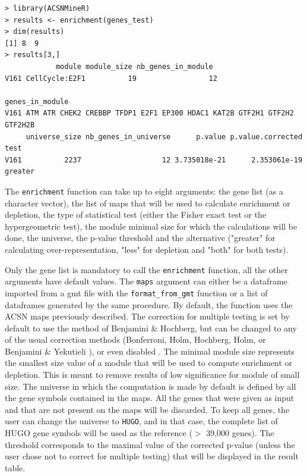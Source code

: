 \documentclass{article}
\begin{document}
\begin{verbatim}
> library(ACSNMineR)
> results <- enrichment(genes_test)
> dim(results)
[1] 8  9
> results[3,]
            module module_size nb_genes_in_module
V161 CellCycle:E2F1          19                 12
                                                             genes_in_module
V161 ATM ATR CHEK2 CREBBP TFDP1 E2F1 EP300 HDAC1 KAT2B GTF2H1 GTF2H2 GTF2H2B
     universe_size nb_genes_in_universe      p.value p.value.corrected    test
V161          2237                   12 3.735018e-21      2.353061e-19 greater
\end{verbatim}


The \verb|enrichment| function can take up to eight arguments: the gene list (as
a character vector), the list of maps that will be used to calculate enrichment
or depletion, the type of statistical test (either the Fisher exact test or the
hypergeometric test), the module minimal size for which the calculations will be
done, the universe, the p-value threshold and the alternative ("greater" for
calculating over-representation, "less" for depletion and "both" for both
tests).

Only the gene list is mandatory to call the \verb|enrichment| function, all the
other arguments have default values.  The \verb|maps| argument can either be a
dataframe imported from a gmt file with the \verb|format_from_gmt| function or
a list of dataframes generated by the same procedure. By default, the function
uses the ACSN maps previously described.  The correction for multiple testing
is set by default to use the method of Benjamini \& Hochberg, but can be
changed to any of the usual correction methods (Bonferroni, Holm, Hochberg,
Holm, or Benjamini \& Yekutieli \cite{Benjamini2003FDR}), or even disabled .
The minimal module size represents the smallest size value of a module that
will be used to compute enrichment or depletion. This is meant to remove
results of low significance for module of small size.  The universe in which
the computation is made by default is defined by all the gene symbols contained
in the maps. All the genes that were given as input and that are not present on
the maps will be discarded. To keep all genes, the user can change the universe
to \verb|HUGO|, and in that case, the complete list of HUGO gene symbols will
be used as the reference ($>$ 39,000 genes). The threshold corresponds to the
maximal value of the corrected p-value (unless the user chose not to correct
for multiple testing) that will be displayed in the result table.
\end{document}
